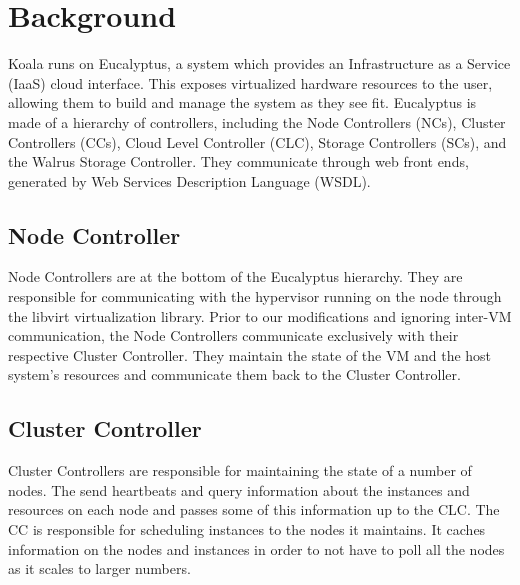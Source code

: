 \section{Background}

Koala runs on Eucalyptus, a system which provides an Infrastructure as a Service (IaaS) cloud interface.  This exposes virtualized hardware resources to the user, allowing them to build and manage the system as they see fit.  Eucalyptus is made of a hierarchy of controllers, including the Node Controllers (NCs), Cluster Controllers (CCs), Cloud Level Controller (CLC), Storage Controllers (SCs), and the Walrus Storage Controller.  They communicate through web front ends, generated by Web Services Description Language (WSDL).

\subsection{Node Controller}
Node Controllers are at the bottom of the Eucalyptus hierarchy.  They are responsible for communicating with the hypervisor running on the node through the libvirt virtualization library.  Prior to our modifications and ignoring inter-VM communication, the Node Controllers communicate exclusively with their respective Cluster Controller.  They maintain the state of the VM and the host system's resources and communicate them back to the Cluster Controller.

\subsection{Cluster Controller}
Cluster Controllers are responsible for maintaining the state of a number of nodes.  The send heartbeats and query information about the instances and resources on each node and passes some of this information up to the CLC.  The CC is responsible for scheduling instances to the nodes it maintains.  It caches information on the nodes and instances in order to not have to poll all the nodes as it scales to larger numbers.

